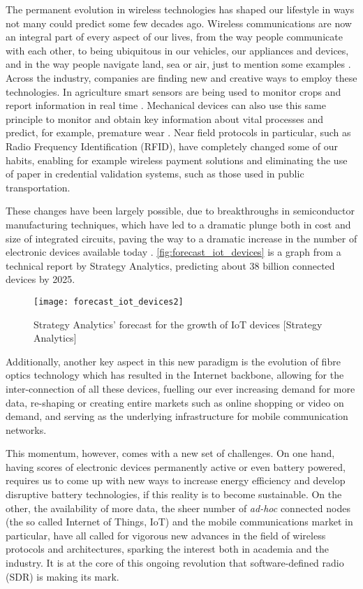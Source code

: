 The permanent evolution in wireless technologies has shaped our lifestyle in ways not many could predict some few decades ago. Wireless communications are now an integral part of every aspect of our lives, from the way people communicate with each other, to being ubiquitous in our vehicles, our appliances and devices, and in the way people navigate land, sea or air, just to mention some examples \cite{wireless_applications}. Across the industry, companies are finding new and creative ways to employ these technologies. In agriculture smart sensors are being used to monitor crops and report information in real time \cite{sdr_sensors}. Mechanical devices can also use this same principle to monitor and obtain key information about vital processes and predict, for example, premature wear \cite{slip_rings}. Near field protocols in particular, such as Radio Frequency Identification (RFID), have completely changed some of our habits, enabling for example wireless payment solutions and eliminating the use of paper in credential validation systems, such as those used in public transportation.

These changes have been largely possible, due to breakthroughs in semiconductor manufacturing techniques, which have led to a dramatic plunge both in cost and size of integrated circuits, paving the way to a dramatic increase in the number of electronic devices available today \cite{semiconductors_evolution}. \autoref{fig:forecast_iot_devices} is a graph from a technical report by Strategy Analytics, predicting about 38 billion connected devices by 2025.

\begin{figure}[H]
  \centering
  \texttt{[image: forecast\_iot\_devices2]}
  \caption{Strategy Analytics' forecast for the growth of IoT devices [Strategy Analytics]}
  \label{fig:forecast_iot_devices}
\end{figure}

Additionally, another key aspect in this new paradigm is the evolution of fibre optics technology which has resulted in the Internet backbone, allowing for the inter-connection of all these devices, fuelling our ever increasing demand for more data, re-shaping or creating entire markets such as online shopping or video on demand, and serving as the underlying infrastructure for mobile communication networks.

This momentum, however, comes with a new set of challenges. On one hand, having scores of electronic devices permanently active or even battery powered, requires us to come up with new ways to increase energy efficiency and develop disruptive battery technologies, if this reality is to become sustainable. On the other, the availability of more data, the sheer number of \emph{ad-hoc} connected nodes (the so called Internet of Things, IoT) and the mobile communications market in particular, have all called for vigorous new advances in the field of wireless protocols and architectures, sparking the interest both in academia and the industry. It is at the core of this ongoing revolution that software-defined radio (SDR) is making its mark.


